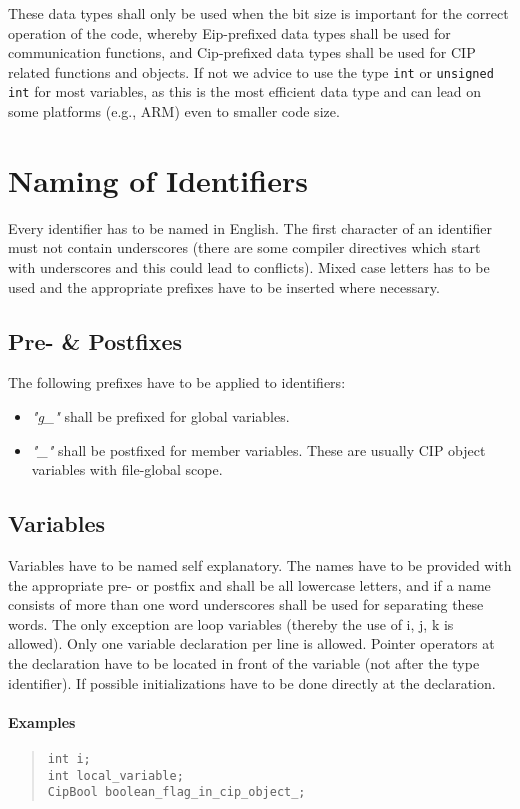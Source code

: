 \documentclass[final,a4paper,10pt, oneside]{article}
\begin{document}
These data types shall only be used when the bit size is important for the correct operation of the code, whereby Eip-prefixed data types shall be used for communication functions, and Cip-prefixed data types shall be used for CIP related functions and objects. If not we advice to use the type \verb|int| or \verb|unsigned int| for most variables, as this is the most efficient data type and can lead on some platforms (e.g., ARM) even to smaller code size.

\section{Naming of Identifiers}
Every identifier has to be named in English. The first character of an identifier must not contain underscores (there are some compiler directives which start with underscores and this could lead to conflicts). Mixed case letters has to be used and the appropriate prefixes have to be inserted where necessary.

\subsection{Pre- \& Postfixes}
The following prefixes have to be applied to identifiers:\\
\begin{itemize}
	\item \emph{"g\_"} shall be prefixed for global variables.
	\item \emph{"\_"} shall be postfixed for member variables. These are usually CIP object variables with file-global scope.
\end{itemize}

\subsection{Variables}
Variables have to be named self explanatory. The names have to be provided with the appropriate pre- or postfix and shall be all lowercase letters, and if a name consists of more than one word underscores shall be used for separating these words. The only exception are loop variables (thereby the use of i, j, k is allowed). Only one variable declaration per line is allowed. Pointer operators at the declaration have to be located in front of the variable (not after the type identifier). If possible initializations have to be done directly at the declaration.

\paragraph{Examples}
\begin{quote}
\begin{lstlisting}
int i;
int local_variable;
CipBool boolean_flag_in_cip_object_;
\end{lstlisting}
\end{quote}
\end{document}
